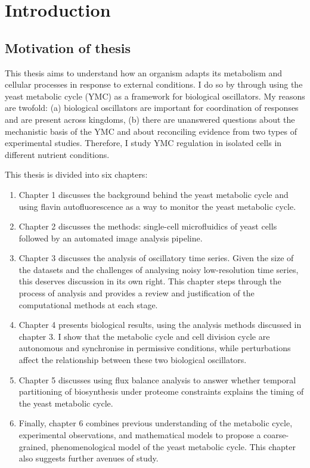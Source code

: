 
\chapter{Introduction}

\section{Motivation of thesis}

This thesis aims to understand how an organism adapts its metabolism and cellular processes in response to external conditions.
I do so by through using the yeast metabolic cycle (YMC) as a framework for biological oscillators.
My reasons are twofold: (a) biological oscillators are important for coordination of responses and are present across kingdoms, (b) there are unanswered questions about the mechanistic basis of the YMC and about reconciling evidence from two types of experimental studies.
Therefore, I study YMC regulation in isolated cells in different nutrient conditions.

This thesis is divided into six chapters:
\begin{enumerate}
  \item Chapter 1 discusses the background behind the yeast metabolic cycle and using flavin autofluorescence as a way to monitor the yeast metabolic cycle.
  \item Chapter 2 discusses the methods: single-cell microfluidics of yeast cells followed by an automated image analysis pipeline.
  \item Chapter 3 discusses the analysis of oscillatory time series.
        Given the size of the datasets and the challenges of analysing noisy low-resolution time series, this deserves discussion in its own right.
        This chapter steps through the process of analysis and provides a review and justification of the computational methods at each stage.
  \item Chapter 4 presents biological results, using the analysis methods discussed in chapter 3.
        I show that the metabolic cycle and cell division cycle are autonomous and synchronise in permissive conditions, while perturbations affect the relationship between these two biological oscillators.
  \item Chapter 5 discusses using flux balance analysis to answer whether temporal partitioning of biosynthesis under proteome constraints explains the timing of the yeast metabolic cycle.
  \item Finally, chapter 6 combines previous understanding of the metabolic cycle, experimental observations, and mathematical models to propose a coarse-grained, phenomenological model of the yeast metabolic cycle.
        This chapter also suggests further avenues of study.
\end{enumerate}


